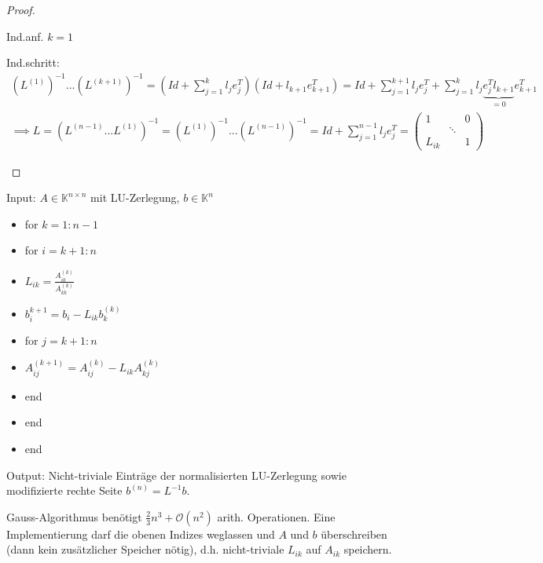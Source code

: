 \begin{proof}
\begin{enumerate}
		Ind.anf. $k=1$\checkmark
		
		Ind.schritt:
		\begin{align*}
			(L^{(1)})^{-1} ... (L^{(k+1)})^{-1} = (Id + \sum_{j=1}^{k} l_j e_j^T) (Id + l_{k+1}e_{k+1}^T) =
			Id + \sum_{j=1}^{k+1} l_j e_j^T + \sum_{j=1}^{k} l_j \underbrace{e_j^T l_{k+1}}_{=0} e_{k+1}^T\\
			\implies L = (L^{(n-1)} ... L^{(1)})^{-1} = (L^{(1)})^{-1} ... (L^{(n-1)})^{-1} =
			Id + \sum_{j=1}^{n-1} l_j e_j^T = \left(\begin{matrix}
				1 & & 0\\
				 &\ddots&\\
				 L_{ik} & &1
			\end{matrix}\right)
		\end{align*}
	\end{enumerate}
\end{proof}

\begin{algorithm}[Implementierung]
	Input: $A \in \mathbb{K}^{n \times n}$ mit LU-Zerlegung, $b \in \mathbb{K}^n$
	
	\begin{itemize}
		\item for $k=1:n-1$
		\item \hspace{0.5cm} for $i=k+1:n$
		\item \hspace{1cm} $L_{ik} = \frac{A_{ik}^{(k)}}{A_{kk}^{(k)}}$
		\item \hspace{1cm} $b_i^{k+1} = b_i - L_{ik} b_k^{(k)}$
		\item \hspace{1cm} for $j=k+1:n$
		\item \hspace{1.5cm} $A_{ij}^{(k+1)} = A_{ij}^{(k)} - L_{ik}A_{kj}^{(k)}$
		\item \hspace{1cm} end
		\item \hspace{0.5cm} end
		\item end
	\end{itemize}
	
	Output: Nicht-triviale Einträge der normalisierten LU-Zerlegung sowie modifizierte rechte Seite $b^{(n)} = L^{-1}b$.
\end{algorithm}

\begin{lemma}
	Gauss-Algorithmus benötigt $\frac{2}{3} n^3 + \mathcal{O}(n^2)$ arith. Operationen. Eine Implementierung darf die obenen Indizes weglassen und $A$ und $b$ überschreiben (dann kein zusätzlicher Speicher nötig), d.h. nicht-triviale $L_{ik}$ auf $A_{ik}$ speichern.
\end{lemma}

